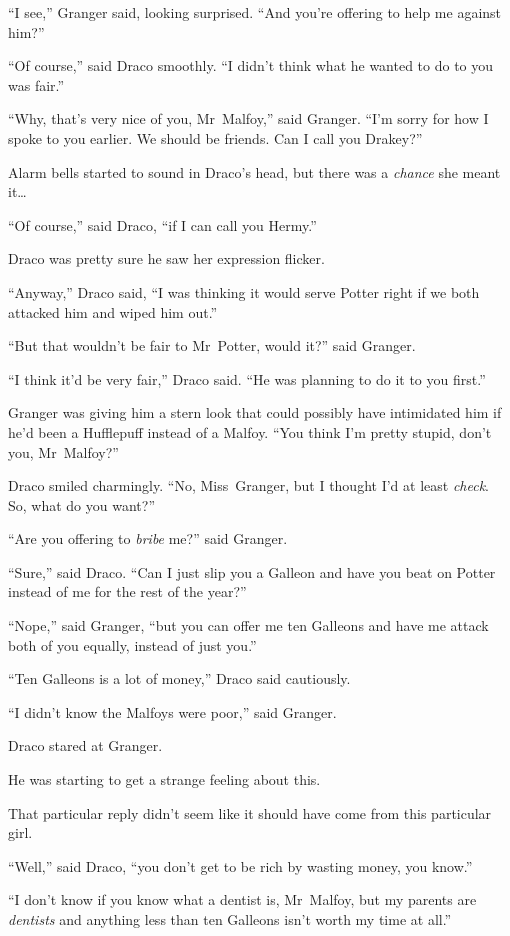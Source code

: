 “I see,” Granger said, looking surprised. “And you’re offering to help me against him?”

“Of course,” said Draco smoothly. “I didn’t think what he wanted to do to you was fair.”

“Why, that’s very nice of you, Mr~Malfoy,” said Granger. “I’m sorry for how I spoke to you earlier. We should be friends. Can I call you Drakey?”

Alarm bells started to sound in Draco’s head, but there was a \emph{chance} she meant it…

“Of course,” said Draco, “if I can call you Hermy.”

Draco was pretty sure he saw her expression flicker.

“Anyway,” Draco said, “I was thinking it would serve Potter right if we both attacked him and wiped him out.”

“But that wouldn’t be fair to Mr~Potter, would it?” said Granger.

“I think it’d be very fair,” Draco said. “He was planning to do it to you first.”

Granger was giving him a stern look that could possibly have intimidated him if he’d been a Hufflepuff instead of a Malfoy. “You think I’m pretty stupid, don’t you, Mr~Malfoy?”

Draco smiled charmingly. “No, Miss~Granger, but I thought I’d at least \emph{check}. So, what do you want?”

“Are you offering to \emph{bribe} me?” said Granger.

“Sure,” said Draco. “Can I just slip you a Galleon and have you beat on Potter instead of me for the rest of the year?”

“Nope,” said Granger, “but you can offer me ten Galleons and have me attack both of you equally, instead of just you.”

“Ten Galleons is a lot of money,” Draco said cautiously.

“I didn’t know the Malfoys were poor,” said Granger.

Draco stared at Granger.

He was starting to get a strange feeling about this.

That particular reply didn’t seem like it should have come from this particular girl.

“Well,” said Draco, “you don’t get to be rich by wasting money, you know.”

“I don’t know if you know what a dentist is, Mr~Malfoy, but my parents are \emph{dentists} and anything less than ten Galleons isn’t worth my time at all.”

